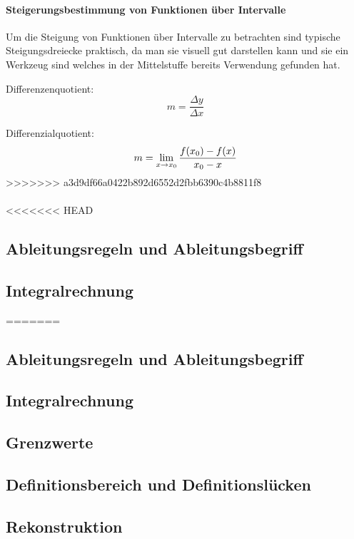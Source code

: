 \documentclass{article}
\begin{document}
\paragraph{Steigerungsbestimmung von Funktionen über Intervalle}

Um die Steigung von Funktionen über Intervalle zu betrachten sind typische Steigungsdreiecke praktisch,
da man sie visuell gut darstellen kann und sie ein Werkzeug sind welches in der Mittelstuffe bereits
Verwendung gefunden hat.

Differenzenquotient:
\[
    m = {\frac {\Delta y} {\Delta x}}
\]

Differenzialquotient:
\[
    m = \lim_{x \to x_{0}} {{f(x_{0}) - f(x)} \over { x_{0} - x}}
\]
>>>>>>> a3d9df66a0422b892d6552d2fbb6390c4b8811f8



		\paragraph{}

<<<<<<< HEAD
	\subsection{Ableitungsregeln und Ableitungsbegriff}\label{Ableitungen}
	
	\subsection{Integralrechnung}\label{Integralrechnung}
=======
\subsection{Ableitungsregeln und Ableitungsbegriff}\label{Ableitungen}
\subsection{Integralrechnung}\label{Integralrechnung}

\subsection{Grenzwerte}
\subsection{Definitionsbereich und Definitionslücken}\label{Definitionsbereich}
\subsection{Rekonstruktion}\label{Rekonstruktion}
\end{document}
